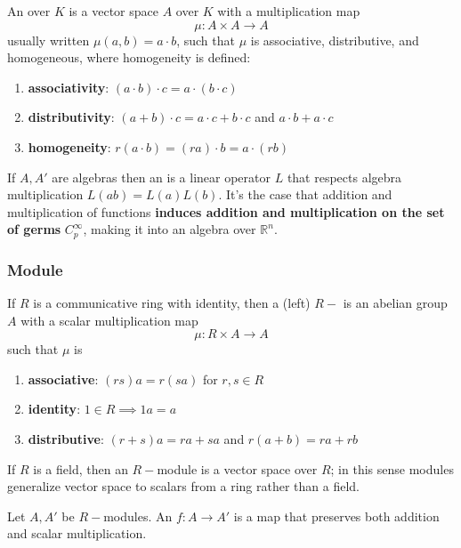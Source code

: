 An  over  \(K\) is a vector space \(A\) over \(K\) with a multiplication map
%
\begin{equation}
    \mu\colon A \times A \rightarrow A
\end{equation}
%
usually written \(\mu(a,b)=a \cdot b\), such that \(\mu\) is associative, distributive, and homogeneous, where homogeneity is defined:
%
\begin{enumerate}
    \item \textbf{associativity}: \((a\cdot b)\cdot c = a \cdot (b \cdot c) \)
    \item \textbf{distributivity}: \((a+b)\cdot c = a\cdot c + b \cdot c\) and \(a\cdot b + a \cdot c\)
    \item \textbf{homogeneity}: \(r(a\cdot b) = (ra)\cdot b = a\cdot (rb)\)
\end{enumerate}
%
If \(A, A'\) are algebras then an  is a linear operator \(L\) that respects algebra multiplication \(L(ab) = L(a)L(b)\).
%
It's the case that addition and multiplication of functions \textbf{induces addition and multiplication on the set of germs} \(C_p^\infty\), making it into an algebra over \(\mathbb{R}^n\).

\subsubsection{Module}

If \(R\) is a communicative ring with identity, then a (left) \(R-\) is an abelian group \(A\) with a scalar multiplication map 
%
\begin{equation}
    \mu \colon R\times A \rightarrow A 
\end{equation}
%
such that \(\mu\) is
%
\begin{enumerate}
    \item \textbf{associative}: \((rs)a = r (sa)\) for \(r,s \in R\)
    \item \textbf{identity}: \(1 \in R \implies 1a=a\)
    \item \textbf{distributive}: \((r+s)a = ra + sa\) and \(r(a+b) = ra + rb\)
\end{enumerate}
%
If \(R\) is a field, then an \(R-\)module is a vector space over \(R\); in this sense modules generalize vector space to scalars from a ring rather than a field.

Let \(A, A'\) be \(R-\)modules. An  \(f\colon A \rightarrow A'\) is a map that preserves both addition and scalar multiplication.